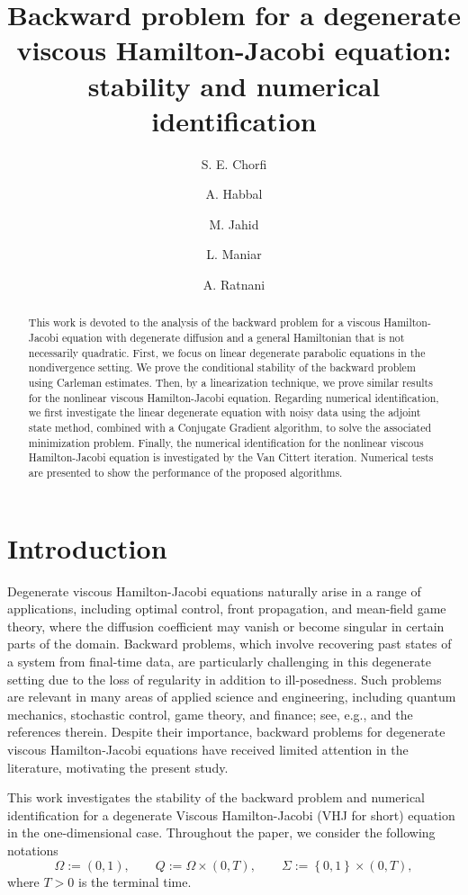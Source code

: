 \documentclass[reqno]{amsart}
\title[Backward problem for a degenerate Hamilton-Jacobi equation] %
{Backward problem for a degenerate viscous Hamilton-Jacobi equation: stability and numerical identification}
\author{S. E. Chorfi}
\author{A. Habbal}
\author{M. Jahid}
\author{L. Maniar}
\author{A. Ratnani}
\theoremstyle{plain}
\theoremstyle{remark}
\numberwithin{equation}{section}
\begin{document}
\begin{abstract}
This work is devoted to the analysis of the backward problem for a viscous Hamilton-Jacobi equation with degenerate diffusion and a general Hamiltonian that is not necessarily quadratic. First, we focus on linear degenerate parabolic equations in the nondivergence setting. We prove the conditional stability of the backward problem using Carleman estimates. Then, by a linearization technique, we prove similar results for the nonlinear viscous Hamilton-Jacobi equation. Regarding numerical identification, we first investigate the linear degenerate equation with noisy data using the adjoint state method, combined with a Conjugate Gradient algorithm, to solve the associated minimization problem. Finally, the numerical identification for the nonlinear viscous Hamilton-Jacobi equation is investigated by the Van Cittert iteration. Numerical tests are presented to show the performance of the proposed algorithms.
\end{abstract}

\maketitle

\section{Introduction}
Degenerate viscous Hamilton-Jacobi equations naturally arise in a range of applications, including optimal control, front propagation, and mean-field game theory, where the diffusion coefficient may vanish or become singular in certain parts of the domain. Backward problems, which involve recovering past states of a system from final-time data, are particularly challenging in this degenerate setting due to the loss of regularity in addition to ill-posedness. Such problems are relevant in many areas of applied science and engineering, including quantum mechanics, stochastic control, game theory, and finance; see, e.g., \cite{BI99} and the references therein. Despite their importance, backward problems for degenerate viscous Hamilton-Jacobi equations have received limited attention in the literature, motivating the present study.

This work investigates the stability of the backward problem and numerical identification for a degenerate Viscous Hamilton-Jacobi (VHJ for short) equation in the one-dimensional case. Throughout the paper, we consider the following notations
$$\Omega :=(0,1),\qquad Q :=\Omega\times (0,T), \qquad \Sigma:=\left\lbrace 0,1\right\rbrace \times(0, T),$$
where $T>0$ is the terminal time.
\end{document}
